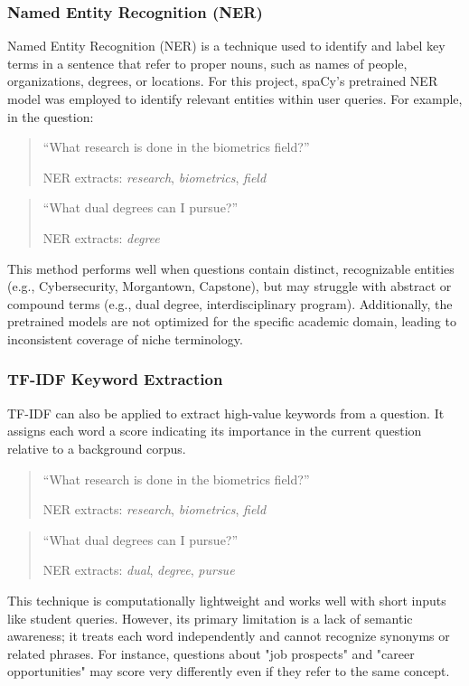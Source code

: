 \documentclass[conference]{IEEEtran}
\begin{document}
\subsubsection{Named Entity Recognition (NER)}
Named Entity Recognition (NER) is a technique used to identify and label key terms in a sentence that refer to proper nouns, such as names of people, organizations, degrees, or locations. 
For this project, spaCy's pretrained NER model \cite{b14} was employed to identify relevant entities within user queries. For example, in the question:

\begin{quote}
    ``What research is done in the biometrics field?''
    
    NER extracts: \textit{research}, \textit{biometrics}, \textit{field} 
\end{quote}

\begin{quote}
    ``What dual degrees can I pursue?''
    
    NER extracts: \textit{degree} 
\end{quote}

This method performs well when questions contain distinct, recognizable entities (e.g., Cybersecurity, Morgantown, Capstone), but may struggle with abstract or compound terms (e.g., dual degree, interdisciplinary program). 
Additionally, the pretrained models are not optimized for the specific academic domain, leading to inconsistent coverage of niche terminology.

\subsubsection{TF-IDF Keyword Extraction}
TF-IDF can also be applied to extract high-value keywords from a question. 
It assigns each word a score indicating its importance in the current question relative to a background corpus.

\begin{quote}
    ``What research is done in the biometrics field?''
    
    NER extracts: \textit{research}, \textit{biometrics}, \textit{field} 
\end{quote}

\begin{quote}
    ``What dual degrees can I pursue?''
    
    NER extracts: \textit{dual}, \textit{degree}, \textit{pursue}
\end{quote}
This technique is computationally lightweight and works well with short inputs like student queries. 
However, its primary limitation is a lack of semantic awareness; it treats each word independently and cannot recognize synonyms or related phrases. 
For instance, questions about "job prospects" and "career opportunities" may score very differently even if they refer to the same concept.
\end{document}
